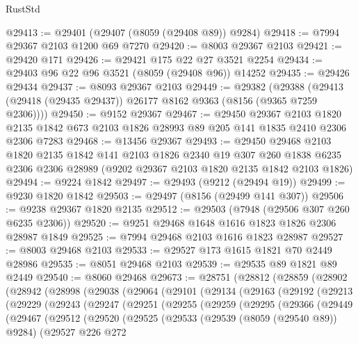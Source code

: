 \begin{lexlean}{RustStd}
\begin{coremodule}
@29413 := @29401 (@29407 (@8059 (@29408 @89)) @9284)
@29418 := @7994 @29367 @2103 @1200 @69 @7270
@29420 := @8003 @29367 @2103
@29421 := @29420 @171
@29426 := @29421 @175 @22 @27 @3521 @2254
@29434 := @29403 @96 @22 @96 @3521 (@8059 (@29408 @96)) @14252
@29435 := @29426 @29434
@29437 := @8093 @29367 @2103
@29449 := @29382
    (@29388 (@29413 (@29418 (@29435 @29437)) @26177 @8162 @9363 (@8156 (@9365 @7259 @2306))))
@29450 := @9152 @29367
@29467 := @29450
    @29367
    @2103
    @1820
    @2135
    @1842
    @673
    @2103
    @1826
    @28993
    @89
    @205
    @141
    @1835
    @2410
    @2306
    @2306
    @7283
@29468 := @13456 @29367
@29493 := @29450
    @29468
    @2103
    @1820
    @2135
    @1842
    @141
    @2103
    @1826
    @2340
    @19
    @307
    @260
    @1838
    @6235
    @2306
    @2306
    @28989
    (@9202 @29367 @2103 @1820 @2135 @1842 @2103 @1826)
@29494 := @9224 @1842
@29497 := @29493 (@9212 (@29494 @19))
@29499 := @9230 @1820 @1842
@29503 := @29497 (@8156 (@29499 @141 @307))
@29506 := @9238 @29367 @1820 @2135
@29512 := @29503 (@7948 (@29506 @307 @260 @6235 @2306))
@29520 := @9251 @29468 @1648 @1616 @1823 @1826 @2306 @28987 @1849
@29525 := @7994 @29468 @2103 @1616 @1823 @28987
@29527 := @8003 @29468 @2103
@29533 := @29527 @173 @1615 @1821 @70 @2449 @28986
@29535 := @8051 @29468 @2103
@29539 := @29535 @89 @1821 @89 @2449
@29540 := @8060 @29468
@29673 := @28751
    (@28812
      (@28859
        (@28902
          (@28942
            (@28998
              (@29038
                (@29064
                  (@29101
                    (@29134
                      (@29163
                        (@29192
                          (@29213
                            (@29229
                              (@29243
                                (@29247
                                  (@29251
                                    (@29255
                                      (@29259
                                        (@29295
                                          (@29366
                                            (@29449
                                              (@29467
                                                (@29512
                                                  (@29520
                                                    (@29525
                                                      (@29533
                                                        (@29539 (@8059 (@29540 @89)) @9284)
                                                        (@29527
                                                          @226
                                                          @272

\end{coremodule}
\end{lexlean}
